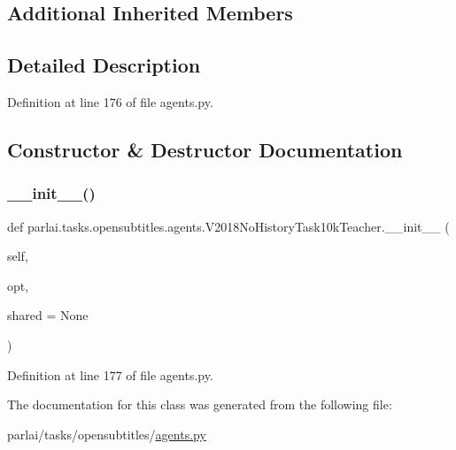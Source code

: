 \subsection*{Additional Inherited Members}


\subsection{Detailed Description}


Definition at line 176 of file agents.\+py.



\subsection{Constructor \& Destructor Documentation}
\mbox{\label{classparlai_1_1tasks_1_1opensubtitles_1_1agents_1_1V2018NoHistoryTask10kTeacher_ace3fc69c7a84c37416b3b50b86735169}} 
\subsubsection{\texorpdfstring{\+\_\+\+\_\+init\+\_\+\+\_\+()}{\_\_init\_\_()}}
{\footnotesize\ttfamily def parlai.\+tasks.\+opensubtitles.\+agents.\+V2018\+No\+History\+Task10k\+Teacher.\+\_\+\+\_\+init\+\_\+\+\_\+ (\begin{DoxyParamCaption}\item[{}]{self,  }\item[{}]{opt,  }\item[{}]{shared = {\ttfamily None} }\end{DoxyParamCaption})}



Definition at line 177 of file agents.\+py.



The documentation for this class was generated from the following file\+:\begin{DoxyCompactItemize}
\item 
parlai/tasks/opensubtitles/\hyperlink{parlai_2tasks_2opensubtitles_2agents_8py}{agents.\+py}\end{DoxyCompactItemize}
